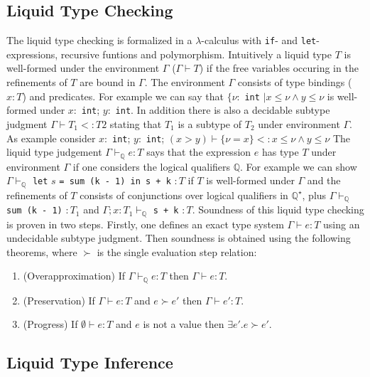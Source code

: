 \documentclass[a4paper,UKenglish]{lipics-v2016}
\begin{document}
\subsection{Liquid Type Checking}

The liquid type checking is formalized in a $\lambda$-calculus with \lstinline{if}- and \lstinline{let}-expressions, recursive funtions and polymorphism.
Intuitively a liquid type $T$ is well-formed under the environment $\Gamma$ ($\Gamma \vdash T$) if the free variables occuring in the refinements of $T$ are bound in $\Gamma$.
The environment $\Gamma$ consists of type bindings ($x: T$) and predicates.
For example we can say that $\{\nu:$ \lstinline{int} $\mid x \le \nu \land y \le \nu$ is well-formed under $x:$ \lstinline{int}; $y:$ \lstinline{int}.
In addition there is also a decidable subtype judgment $\Gamma \vdash T_1 <: T2$ stating that $T_1$ is a subtype of $T_2$ under environment $\Gamma$.
As example consider $x:$ \lstinline{int}; $y:$ \lstinline{int}; $(x > y) \vdash \{\nu = x \} <: x \le \nu \land y \le \nu$
The liquid type judgement $\Gamma \vdash_{\mathbb{Q}} e: T$ says that the expression $e$ has type $T$ under environment $\Gamma$ if one considers the logical qualifiers $\mathbb{Q}$.
For example we can show $\Gamma \vdash_{\mathbb{Q}}$ \lstinline{let} $s$ \lstinline{= sum (k - 1) in s + k} $: T$ if $T$ is well-formed under $\Gamma$ and the refinements of $T$ consists of conjunctions over logical qualifiers in $\mathbb{Q}^\star$, plus
$\Gamma \vdash_{\mathbb{Q}}$ \lstinline{sum (k - 1)} $:T_1$ and $\Gamma; x: T_1 \vdash_{\mathbb{Q}}$ \lstinline{s + k} $: T$.
Soundness of this liquid type checking is proven in two steps.
Firstly, one defines an exact type system $\Gamma \vdash e: T$ using an undecidable subtype judgment.
Then soundness is obtained using the following theorems, where $\succ$ is the single evaluation step relation:
\begin{enumerate}
    \label{thm:sound}
    \item (Overapproximation) If $\Gamma \vdash_{\mathbb{Q}} e: T$ then $\Gamma \vdash e: T$.
    \item (Preservation) If $\Gamma \vdash e: T$ and $e \succ e'$ then $\Gamma \vdash e': T$.
    \item (Progress) If $\emptyset \vdash e: T$ and $e$ is not a value then $\exists e'. e \succ e'$.
\end{enumerate}


\subsection{Liquid Type Inference}
\end{document}
